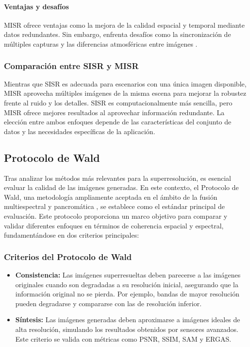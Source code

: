             \paragraph{Ventajas y desafíos}
    
                MISR ofrece ventajas como la mejora de la calidad espacial y temporal mediante datos redundantes. Sin embargo, enfrenta desafíos como la sincronización de múltiples capturas y las diferencias atmosféricas entre imágenes \textcite{salvetti2020multi}.
    
        \subsubsection{Comparación entre SISR y MISR}
    
            Mientras que SISR es adecuada para escenarios con una única imagen disponible, MISR aprovecha múltiples imágenes de la misma escena para mejorar la robustez frente al ruido y los detalles. SISR es computacionalmente más sencilla, pero MISR ofrece mejores resultados al aprovechar información redundante. La elección entre ambos enfoques depende de las características del conjunto de datos y las necesidades específicas de la aplicación.


    \subsection{Protocolo de Wald}

        Tras analizar los métodos más relevantes para la superresolución, es esencial evaluar la calidad de las imágenes generadas. En este contexto, el Protocolo de Wald, una metodología ampliamente aceptada en el ámbito de la fusión multiespectral y pancromática \autocite{wald1997fusion}, se establece como el estándar principal de evaluación. Este protocolo proporciona un marco objetivo para comparar y validar diferentes enfoques en términos de coherencia espacial y espectral, fundamentándose en dos criterios principales:

        \subsubsection{Criterios del Protocolo de Wald}
        
            \begin{itemize}
                \item \textbf{Consistencia:} Las imágenes superresueltas deben parecerse a las imágenes originales cuando son degradadas a su resolución inicial, asegurando que la información original no se pierda. Por ejemplo, bandas de mayor resolución pueden degradarse y compararse con las de resolución inferior.
                \item \textbf{Síntesis:} Las imágenes generadas deben aproximarse a imágenes ideales de alta resolución, simulando los resultados obtenidos por sensores avanzados. Este criterio se valida con métricas como PSNR, SSIM, SAM y ERGAS.
            \end{itemize}   
        
